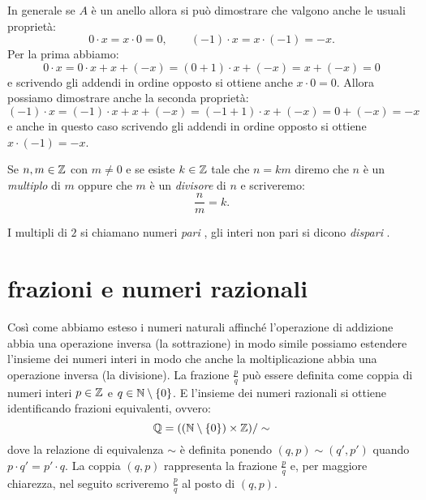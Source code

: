 In generale se $A$ è un anello allora si può dimostrare che valgono anche le usuali proprietà:
\[
  0\cdot x = x\cdot 0 = 0, \qquad
  (-1)\cdot x = x \cdot (-1) = -x.
\]
Per la prima abbiamo: 
\[
  0\cdot x = 0\cdot x + x + (-x) = (0+1)\cdot x + (-x) = x + (-x) = 0
\]
e scrivendo gli addendi in ordine opposto si ottiene anche $x\cdot 0 = 0$.
Allora possiamo dimostrare anche la seconda proprietà:
\[
   (-1)\cdot x = (-1)\cdot x + x + (-x) = (-1 + 1)\cdot x + (-x) = 0 + (-x) = -x
\]
e anche in questo caso scrivendo gli addendi in ordine opposto si ottiene $x\cdot(-1)=-x$.

Se $n,m\in{\mathbb Z}$ con $m\neq 0$ e 
%
se esiste $k\in{\mathbb Z}$ tale 
che $n=km$ diremo che $n$ è un \emph{multiplo}
di $m$ oppure che $m$ è un \emph{divisore}%
%
 di $n$
e scriveremo:
\[
  \frac{n}{m} = k.  
\]

I multipli di $2$ si chiamano numeri \emph{pari}%
%
,
gli interi non pari si dicono \emph{dispari}%
%
. 


\section{frazioni e numeri razionali}

Così come abbiamo esteso i numeri naturali affinché l'operazione di addizione abbia 
una operazione inversa (la sottrazione) in modo simile possiamo estendere l'insieme 
dei numeri interi in modo che anche la moltiplicazione abbia una operazione inversa 
(la divisione). 
La frazione $\frac p q$ può essere definita come coppia 
di numeri interi $p\in {\mathbb Z}$ e $q\in {\mathbb N}\setminus {\left\{ 0 \right\}}$. 
E l'insieme dei numeri razionali si ottiene identificando 
frazioni equivalenti, ovvero: 
\[
  {\mathbb Q} = (({\mathbb N} \setminus{\left\{ 0 \right\}})\times {\mathbb Z})/\sim  
\]
dove la relazione di equivalenza $\sim$ è definita ponendo 
$(q,p) \sim (q',p')$ quando $p\cdot q' = p'\cdot q$.
La coppia $(q,p)$ rappresenta la frazione $\frac p q$ e, 
per maggiore chiarezza, nel seguito scriveremo $\frac p q$ 
al posto di $(q,p)$.

